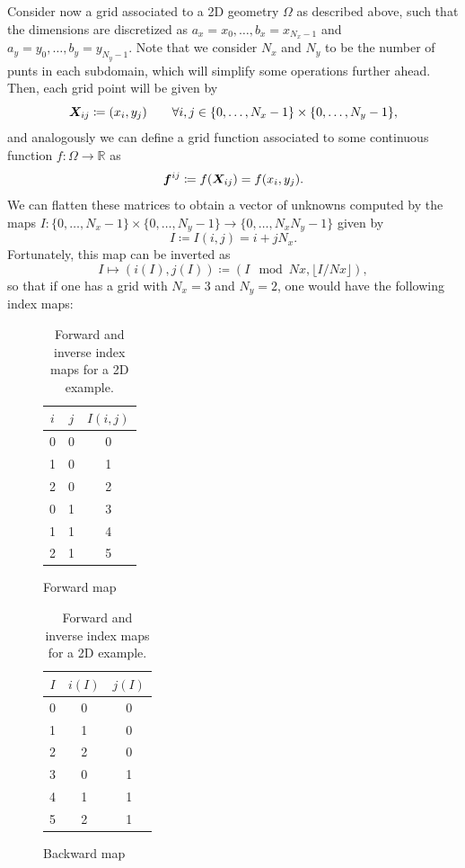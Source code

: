 \documentclass{article}
\renewcommand{\vec}{\vectorsym}
\newcommand{\R}{\mathbb{R}}
\begin{document}
    Consider now a grid associated to a 2D geometry $\Omega$ as described above, such that the dimensions are discretized as $ a_x = x_0, \hdots, b_x = x_{N_x-1}$ and $a_y = y_0, \hdots, b_y = y_{N_y-1}$. Note that we consider $N_x$ and $N_y$ to be the number of punts in each subdomain, which will simplify some operations further ahead. Then, each grid point will be given by     
    $$ \vec X_{ij} \coloneqq (x_i, y_j) \qquad \forall i,j \in \{0,\hdots, N_x-1\}\times \{0,\hdots, N_y-1\}, $$
and analogously we can define a grid function associated to some continuous function $f:\Omega\to \R$ as 
$$ \vec f^{ij} \coloneqq f(\vec X_{ij}) = f(x_i, y_j). $$
We can flatten these matrices to obtain a vector of unknowns computed by the maps $I: \{0,\hdots, N_x-1\} \times \{0, \hdots, N_y-1\}\to \{0,\hdots, N_xN_y-1\}$ given by 
    $$ I \coloneqq I(i,j) = i + j N_x.$$
Fortunately, this map can be inverted as
    $$ I \mapsto (i(I), j(I)) \coloneqq (I\mod Nx, \lfloor I/Nx \rfloor), $$
so that if one has a grid with $N_x=3$ and $N_y=2$, one would have the following index maps: 
    \begin{table}[ht!]
        \centering
        \begin{subfigure}{0.45\textwidth}
            \centering
        \begin{tabular}{c c | c}
            \toprule $i$ & $j$ & $I(i,j)$ \\ \midrule
            0 & 0 & 0 \\
            1 & 0 & 1 \\
            2 & 0 & 2 \\
            0 & 1 & 3 \\
            1 & 1 & 4 \\
            2 & 1 & 5 \\ \bottomrule
        \end{tabular}
        \caption{Forward map}
        \end{subfigure}
        \begin{subfigure}{0.45\textwidth}
            \centering
        \begin{tabular}{c | c c}
            \toprule $I$ & $i(I)$ & $j(I)$ \\ \midrule
            0 & 0 & 0 \\
            1 & 1 & 0 \\
            2 & 2 & 0 \\
            3 & 0 & 1 \\
            4 & 1 & 1 \\
            5 & 2 & 1 \\ \bottomrule
        \end{tabular}
        \caption{Backward map}
        \end{subfigure}
        \caption{Forward and inverse index maps for a 2D example.}
    \end{table}
\end{document}
